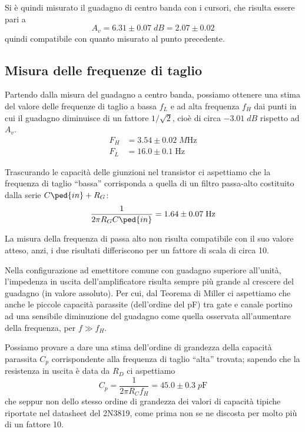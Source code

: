 \documentclass[10pt, a4paper, italian]{article}
\begin{document}
Si è quindi misurato il guadagno di centro banda con i cursori, che risulta
essere pari a
\[
A_v = 6.31 \pm 0.07 \; \si{dB} = 2.07 \pm 0.02
\]
quindi compatibile con quanto misurato al punto precedente.

\subsection{Misura delle frequenze di taglio}\label{sbs: fT}
Partendo dalla misura del guadagno a centro banda, possiamo
ottenere una stima del valore delle frequenze di taglio a bassa $f_L$ e ad
alta frequenza $f_H$ dai punti in cui il guadagno diminuisce di un fattore
$1/\sqrt{2}$, cioè di circa $-3.01 \; \si{dB}$ rispetto ad $A_v$.
\begin{align*}
F_{H} &= 3.54 \pm 0.02 \; \si{M\Hz} \\
F_{L} &= 16.0 \pm 0.1 \; \si{\Hz}
\end{align*}

Trascurando le capacità delle giunzioni nel transistor ci aspettiamo che la
frequenza di taglio ``bassa'' corrisponda a quella di un filtro passa-alto
costituito dalla serie $C\ped{in} + R_G$:
\begin{equation}
\frac{1}{2\pi R_G C\ped{in}} = 1.64 \pm 0.07 \; \si{\Hz}
\end{equation}

La misura della frequenza di passa alto non risulta compatibile con il suo
valore atteso, anzi, i due risultati differiscono per un fattore di scala di
circa 10.

Nella configurazione ad emettitore comune con guadagno superiore all'unità,
l'impedenza in uscita dell'amplificatore risulta sempre più grande al
crescere del guadagno (in valore assoluto). Per cui, dal Teorema di Miller ci
aspettiamo che anche le piccole capacità parassite (dell'ordine del pF) tra
gate e canale portino ad una sensibile diminuzione del guadagno come quella
osservata all'aumentare della frequenza, per $f \gg f_{H}$.

Possiamo provare a dare una stima dell'ordine di grandezza della capacità
parassita $C_p$ corrispondente alla frequenza di taglio ``alta'' trovata;
sapendo che la resistenza in uscita è data da $R_D$ ci aspettiamo
\[
C_p = \frac{1}{2\pi R_C f_H} = 45.0 \pm 0.3 \; \si{p\F}
\]
che seppur non dello stesso ordine di grandezza dei valori di capacità
tipiche riportate nel datasheet del 2N3819, come prima non se ne discosta per
molto più di un fattore 10.

\end{document}
